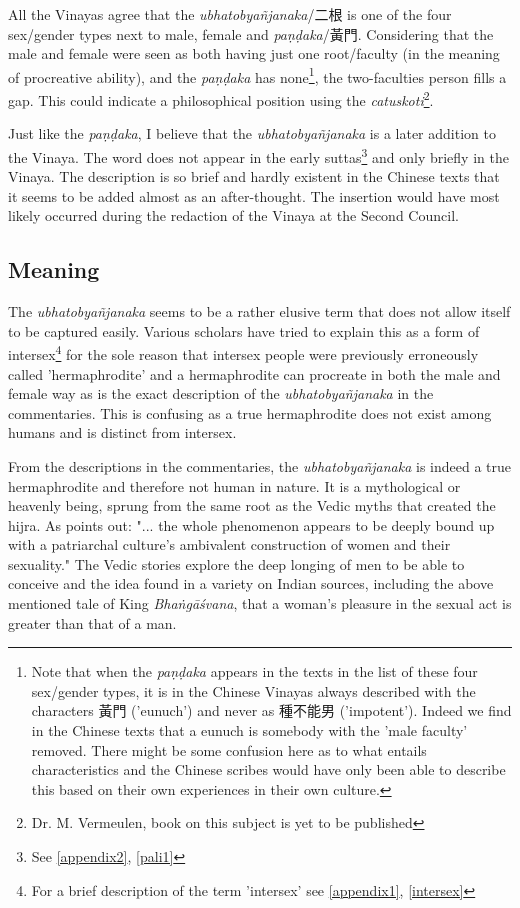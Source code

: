 All the Vinayas agree that the {\em ubhatob­yañ­janaka}/二根 is one of the four sex/gender types next to male, female and {\em paṇḍaka}/黃門. Considering that the male and female were seen as both having just one root/faculty (in the meaning of procreative ability), and the {\em paṇḍaka} has none\footnote{Note that when the {\em paṇḍaka} appears in the texts in the list of these four sex/gender types, it is in the Chinese Vinayas always described with the characters 黃門 ('eunuch') and never as 種不能男 ('impotent'). Indeed we find in the Chinese texts that a eunuch is somebody with the 'male faculty' removed. There might be some confusion here as to what entails characteristics and the Chinese scribes would have only been able to describe this based on their own experiences in their own culture.}, the two-faculties person fills a gap. This could indicate a philosophical position using the {\em catuskoti}\footnote{Dr. M. Vermeulen, book on this subject is yet to be published}. 

Just like the {\em paṇḍaka}, I believe that the {\em ubhatob­yañ­janaka} is a later addition to the Vinaya. The word does not appear in the early suttas\footnote{See \ref{appendix2}, \ref{pali1}} and only briefly in the Vinaya. The description is so brief and hardly existent in the Chinese texts that it seems to be added almost as an after-thought. The insertion would have most likely occurred during the redaction of the Vinaya at the Second Council.

\subsection{Meaning}
The {\em ubhatob­yañ­janaka} seems to be a rather elusive term that does not allow itself to be captured easily. Various scholars have tried to explain this as a form of intersex\footnote{For a brief description of the term 'intersex' see \ref{appendix1}, \ref{intersex}} for the sole reason that intersex people were previously erroneously called 'hermaphrodite' and a hermaphrodite can procreate in both the male and female way as is the exact description of the {\em ubhatob­yañ­janaka} in the commentaries. This is confusing as a true hermaphrodite does not exist among humans and is distinct from intersex. 

From the descriptions in the commentaries, the {\em ubhatob­yañ­janaka} is indeed a true hermaphrodite and therefore not human in nature. It is a mythological or heavenly being, sprung from the same root as the Vedic myths that created the hijra. As \cite{goldman} points out: "... the whole phenomenon appears to be deeply bound up with a patriarchal culture's ambivalent construction of women and their sexuality." The Vedic stories explore the deep longing of men to be able to conceive and the idea found in a variety on Indian sources, including the above mentioned tale of King {\em Bhaṅgāśvana}, that a woman's pleasure in the sexual act is greater than that of a man.

